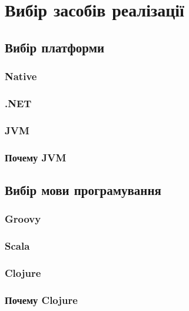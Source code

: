 \newpage
\section{Вибір засобів реалізації}
\subsection{Вибір платформи}
\subsubsection{Native}
\subsubsection{.NET}
\subsubsection{JVM}
\subsubsection{Почему JVM}
\subsection{Вибір мови програмування}
\subsubsection{Groovy}
\subsubsection{Scala}
\subsubsection{Clojure}
\subsubsection{Почему Clojure}